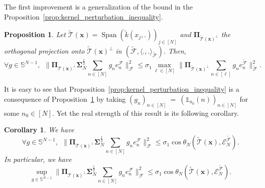 \documentclass[twoside,11pt]{book}
\newtheorem{corollary}{Corollary}
\newtheorem{proposition}{Proposition}
\numberwithin{theorem}{chapter}
\numberwithin{definition}{chapter}
\numberwithin{proposition}{chapter}
\numberwithin{corollary}{chapter}
\numberwithin{example}{chapter}
\numberwithin{lemma}{chapter}
\DeclareMathOperator{\Span}{\mathrm{Span}}
\begin{document}
The first improvement is a generalization of the bound in the Proposition~\ref{prop:kernel_perturbation_inequality}. 

\begin{proposition}\label{prop:strong_kernel_perturbation_inequality}
Let $ \tilde{\mathcal{T}}(\bm{x}) = \Span \left( \tilde{k}(x_{j},.) \right)_{j \in [N]}$ and $\bm{\Pi}_{\tilde{\mathcal{T}}(\bm{x})^{\perp}}$ the orthogonal projection onto $\tilde{\mathcal{T}}(\bm{x})^{\perp}$ in $(\tilde{\mathcal{F}}, \langle .,.\rangle_{\tilde{\mathcal{F}}})$. Then,
\begin{equation}\label{eq:kernel_perturbation_inequality_generalization}
    \forall g \in \mathbb{S}^{N-1}, \:\: \|\bm{\Pi}_{\mathcal{T}(\bm{x})^{\perp}} \bm{\Sigma}_{N}^{\frac{1}{2}} \sum\limits_{n \in [N]}g_{n} e_{n}^{\mathcal{F}}\|_{\mathcal{F}}^{2} \leq \sigma_{1} \max\limits_{\ell \in [N]}   \|\bm{\Pi}_{\tilde{\mathcal{T}}(\bm{x})^{\perp}} \sum\limits_{n \in [\ell]}g_{n} e_{n}^{\tilde{\mathcal{F}}}\|_{\tilde{\mathcal{F}}}^{2}.
\end{equation}
\end{proposition}

It is easy to see that Proposition~\ref{prop:kernel_perturbation_inequality} is a consequence of Proposition~\ref{prop:strong_kernel_perturbation_inequality} by taking $(g_{n})_{n \in [N]}~=~(\mathbb{1}_{n_{0}}(n))_{n \in [N]}$ for some $n_{0} \in [N]$. Yet the real strength of this result is its following corollary.

\begin{corollary}
We have 
\begin{equation}\label{eq:kernel_perturbation_inequality_generalization_principal_angles}
    \forall g \in \mathbb{S}^{N-1}, \:\: \|\bm{\Pi}_{\mathcal{T}(\bm{x})^{\perp}} \bm{\Sigma}_{N}^{\frac{1}{2}} \sum\limits_{n \in [N]}g_{n} e_{n}^{\mathcal{F}}\|_{\mathcal{F}}^{2} \leq \sigma_{1} \cos  \theta_{N}(\tilde{\mathcal{T}}(\bm{x}),\mathcal{E}_{N}^{\tilde{\mathcal{F}}}).
\end{equation}
In particular, we have
\begin{equation}\label{eq:kernel_perturbation_inequality_generalization_principal_angles}
     \sup\limits_{g \in \mathbb{S}^{N-1}}\|\bm{\Pi}_{\mathcal{T}(\bm{x})^{\perp}} \bm{\Sigma}_{N}^{\frac{1}{2}} \sum\limits_{n \in [N]}g_{n} e_{n}^{\mathcal{F}}\|_{\mathcal{F}}^{2} \leq \sigma_{1} \cos \theta_{N}(\tilde{\mathcal{T}}(\bm{x}),\mathcal{E}_{N}^{\tilde{\mathcal{F}}}).
\end{equation}

\end{corollary}
\end{document}
